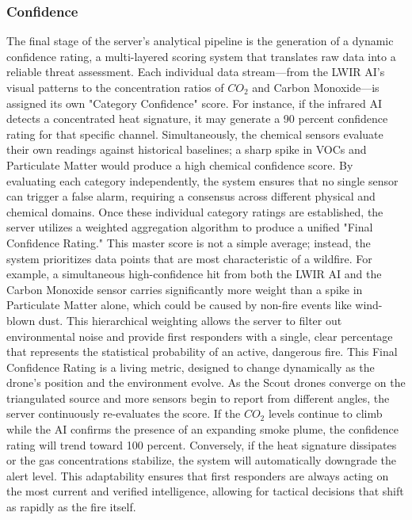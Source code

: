 \documentclass[journal, onecolumn]{IEEEtran}
\begin{document}
\vspace{0.5em}
\subsubsection{Confidence}
The final stage of the server’s analytical pipeline is the generation of a dynamic confidence rating, a multi-layered scoring system that translates raw data into a reliable threat assessment. Each individual data stream—from the LWIR AI’s visual patterns to the concentration ratios of $CO_2$ and Carbon Monoxide—is assigned its own "Category Confidence" score. For instance, if the infrared AI detects a concentrated heat signature, it may generate a 90 percent confidence rating for that specific channel. Simultaneously, the chemical sensors evaluate their own readings against historical baselines; a sharp spike in VOCs and Particulate Matter would produce a high chemical confidence score. By evaluating each category independently, the system ensures that no single sensor can trigger a false alarm, requiring a consensus across different physical and chemical domains.
Once these individual category ratings are established, the server utilizes a weighted aggregation algorithm to produce a unified "Final Confidence Rating." This master score is not a simple average; instead, the system prioritizes data points that are most characteristic of a wildfire. For example, a simultaneous high-confidence hit from both the LWIR AI and the Carbon Monoxide sensor carries significantly more weight than a spike in Particulate Matter alone, which could be caused by non-fire events like wind-blown dust. This hierarchical weighting allows the server to filter out environmental noise and provide first responders with a single, clear percentage that represents the statistical probability of an active, dangerous fire.
This Final Confidence Rating is a living metric, designed to change dynamically as the drone's position and the environment evolve. As the Scout drones converge on the triangulated source and more sensors begin to report from different angles, the server continuously re-evaluates the score. If the $CO_2$ levels continue to climb while the AI confirms the presence of an expanding smoke plume, the confidence rating will trend toward 100 percent. Conversely, if the heat signature dissipates or the gas concentrations stabilize, the system will automatically downgrade the alert level. This adaptability ensures that first responders are always acting on the most current and verified intelligence, allowing for tactical decisions that shift as rapidly as the fire itself.
\end{document}
